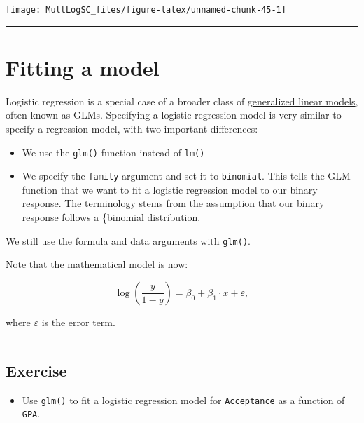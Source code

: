 \documentclass[]{book}
\providecommand{\tightlist}{%
  \setlength{\itemsep}{0pt}\setlength{\parskip}{0pt}}
\begin{document}
\begin{center}\texttt{[image: MultLogSC\_files/figure-latex/unnamed-chunk-45-1]} \end{center}

\begin{center}\rule{0.5\linewidth}{\linethickness}\end{center}

\section{Fitting a model}\label{fitting-a-model}

Logistic regression is a special case of a broader class of
\href{https://en.wikipedia.org/wiki/Generalized_linear_model}{generalized
linear models}, often known as GLMs. Specifying a logistic regression
model is very similar to specify a regression model, with two important
differences:

\begin{itemize}
\item
  We use the \texttt{glm()} function instead of \texttt{lm()}
\item
  We specify the \texttt{family} argument and set it to
  \texttt{binomial}. This tells the GLM function that we want to fit a
  logistic regression model to our binary response.
  \href{https://en.wikipedia.org/wiki/Binomial_distribution}{The
  terminology stems from the assumption that our binary response follows
  a \{binomial distribution.}
\end{itemize}

We still use the formula and data arguments with \texttt{glm()}.

Note that the mathematical model is now:

\begin{equation}
\log\left(\frac{y}{1-y}\right) = \beta_0 + \beta_1 \cdot x + \varepsilon,
\end{equation}

where \(\varepsilon\) is the error term.

\begin{center}\rule{0.5\linewidth}{\linethickness}\end{center}

\subsection*{Exercise}\label{exercise-14}

\begin{itemize}
\tightlist
\item
  Use \texttt{glm()} to fit a logistic regression model for
  \texttt{Acceptance} as a function of \texttt{GPA}.
\end{itemize}
\end{document}
